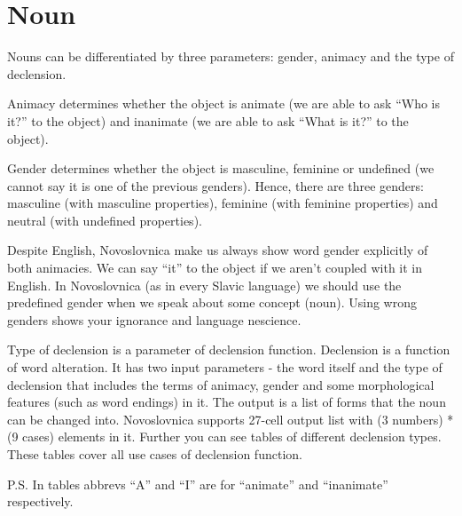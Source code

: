 \section{Noun}


Nouns can be differentiated by three parameters: gender, animacy and the type of declension.

Animacy determines whether the object is animate (we are able to ask “Who is it?” to the object) and inanimate (we are able to ask “What is it?” to the object).

Gender determines whether the object is masculine, feminine or undefined (we cannot say it is one of the previous genders). Hence, there are three genders: masculine (with masculine properties), feminine (with feminine properties) and neutral (with undefined properties).

Despite English, Novoslovnica make us always show word gender explicitly of both animacies. We can say “it” to the object if we aren’t coupled with it in English. In Novoslovnica (as in every Slavic language) we should use the predefined gender when we speak about some concept (noun). Using wrong genders shows your ignorance and language nescience.

Type of declension is a parameter of declension function. Declension is a function of word alteration. It has two input parameters - the word itself and the type of declension that includes the terms of animacy, gender and some morphological features (such as word endings) in it. The output is a list of forms that the noun can be changed into. Novoslovnica supports 27-cell output list with (3 numbers) * (9 cases) elements in it. Further you can see tables of different declension types. These tables cover all use cases of declension function.

P.S. In tables abbrevs “A” and “I” are for “animate” and “inanimate” respectively.

